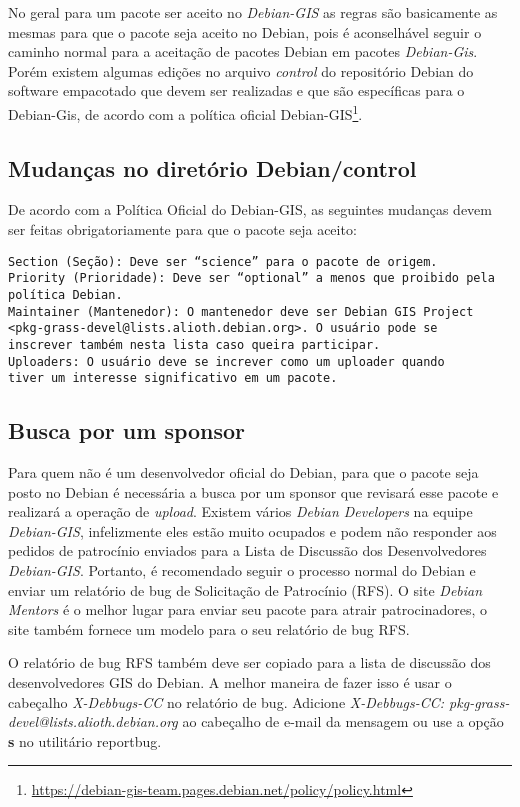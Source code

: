 No geral para um pacote ser aceito no \textit{Debian-GIS} as regras são basicamente as mesmas para que o pacote seja aceito no Debian, pois é aconselhável seguir o caminho normal para a aceitação de pacotes Debian em pacotes \textit{Debian-Gis}. Porém existem algumas edições no arquivo \textit{control} do repositório Debian do software empacotado que devem ser realizadas e que são específicas para o Debian-Gis, de acordo com a política oficial Debian-GIS\footnote{ \url{https://debian-gis-team.pages.debian.net/policy/policy.html}}.

\subsection{Mudanças no diretório Debian/control}
De acordo com a Política Oficial do Debian-GIS, as seguintes mudanças devem ser feitas obrigatoriamente para que o pacote seja aceito: %
\begin{verbatim}
Section (Seção): Deve ser “science” para o pacote de origem.
Priority (Prioridade): Deve ser “optional” a menos que proibido pela
política Debian.
Maintainer (Mantenedor): O mantenedor deve ser Debian GIS Project
<pkg-grass-devel@lists.alioth.debian.org>. O usuário pode se
inscrever também nesta lista caso queira participar.
Uploaders: O usuário deve se increver como um uploader quando
tiver um interesse significativo em um pacote.
\end{verbatim}

\subsection{Busca por um sponsor}

Para quem não é um desenvolvedor oficial do Debian, para que o pacote seja posto no Debian é necessária a busca por um sponsor que revisará esse pacote e realizará a operação de \textit{upload}. Existem vários \textit{Debian Developers} na equipe \textit{Debian-GIS}, infelizmente eles estão muito ocupados e podem não responder aos pedidos de patrocínio enviados para a Lista de Discussão dos Desenvolvedores \textit{Debian-GIS}. Portanto, é recomendado seguir o processo normal do Debian e enviar um relatório de bug de Solicitação de Patrocínio (RFS). O site \textit{Debian Mentors} é o melhor lugar para enviar seu pacote para atrair patrocinadores, o site também fornece um modelo para o seu relatório de bug RFS.

O relatório de bug RFS também deve ser copiado para a lista de discussão dos desenvolvedores GIS do Debian. A melhor maneira de fazer isso é usar o cabeçalho\textit{ X-Debbugs-CC} no relatório de bug. Adicione \textit{X-Debbugs-CC: pkg-grass-devel@lists.alioth.debian.org} ao cabeçalho de e-mail da mensagem ou use a opção \textbf{s} no utilitário reportbug. %